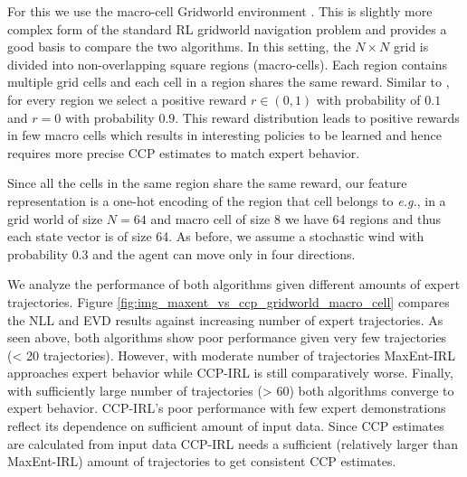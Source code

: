 \documentclass{article}
\begin{document}
For this we use the macro-cell Gridworld environment \cite{abbeel2004apprenticeship}. This is slightly more complex form of the standard RL gridworld navigation problem and provides a good basis to compare the two algorithms. 
In this setting, the $N \times N$ grid is divided into non-overlapping square regions (macro-cells). Each region contains multiple grid cells and each cell in a region shares the same reward. Similar to \cite{abbeel2004apprenticeship}, for every region we select a positive reward $r \in (0, 1)$ with probability of $0.1$ and $r = 0$ with probability $0.9$. This reward distribution leads to positive rewards in few macro cells which results in interesting policies to be learned and hence requires more precise CCP estimates to match expert behavior.

Since all the cells in the same region share the same reward, our feature representation is a one-hot encoding of the region that cell belongs to \emph{e.g.}, in a grid world of size $N=64$ and macro cell of size 8 we have 64 regions and thus each state vector is of size 64. As before, we assume a stochastic wind with probability $0.3$ and the agent can move only in four directions. 

We analyze the performance of both algorithms given different amounts of expert trajectories.
Figure \ref{fig:img_maxent_vs_ccp_gridworld_macro_cell} compares the NLL and EVD results against increasing number of expert trajectories.
As seen above, both algorithms show poor performance given very few trajectories (< 20 trajectories).
However, with moderate number of trajectories MaxEnt-IRL approaches expert behavior while CCP-IRL is still comparatively worse.
Finally, with sufficiently large number of trajectories (> 60) both algorithms converge to expert behavior. 
CCP-IRL's poor performance with few expert demonstrations reflect its dependence on sufficient amount of input data.
Since CCP estimates are calculated from input data CCP-IRL needs a sufficient (relatively larger than MaxEnt-IRL) amount of trajectories to get consistent CCP estimates.

\end{document}
